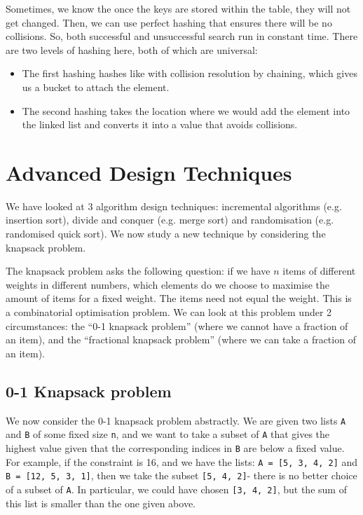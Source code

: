 \documentclass[a4paper, openany]{memoir}
\begin{document}
Sometimes, we know the once the keys are stored within the table, they will not get changed. Then, we can use perfect hashing that ensures there will be no collisions. So, both successful and unsuccessful search run in constant time. There are two levels of hashing here, both of which are universal:
\begin{itemize}
    \item The first hashing hashes like with collision resolution by chaining, which gives us a bucket to attach the element.
    \item The second hashing takes the location where we would add the element into the linked list and converts it into a value that avoids collisions.
\end{itemize}
\newpage

\section{Advanced Design Techniques}
We have looked at 3 algorithm design techniques: incremental algorithms (e.g. insertion sort), divide and conquer (e.g. merge sort) and randomisation (e.g. randomised quick sort). We now study a new technique by considering the knapsack problem.

\noindent The knapsack problem asks the following question: if we have $n$ items of different weights in different numbers, which elements do we choose to maximise the amount of items for a fixed weight. The items need not equal the weight. This is a combinatorial optimisation problem. We can look at this problem under 2 circumstances: the ``0-1 knapsack problem'' (where we cannot have a fraction of an item), and the ``fractional knapsack problem'' (where we can take a fraction of an item).

\subsection{0-1 Knapsack problem}
We now consider the 0-1 knapsack problem abstractly. We are given two lists \texttt{A} and \texttt{B} of some fixed size \texttt{n}, and we want to take a subset of \texttt{A} that gives the highest value given that the corresponding indices in \texttt{B} are below a fixed value. For example, if the constraint is 16, and we have the lists: \texttt{A = [5, 3, 4, 2]} and \texttt{B = [12, 5, 3, 1]}, then we take the subset \texttt{[5, 4, 2]}- there is no better choice of a subset of \texttt{A}. In particular, we could have chosen \texttt{[3, 4, 2]}, but the sum of this list is smaller than the one given above.
\end{document}
